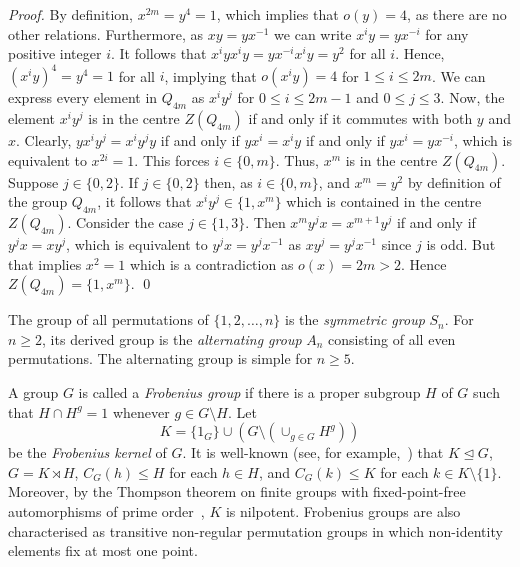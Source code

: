 \documentclass{elsarticle}
\begin{document}
\begin{proof}
  By definition, $x^{2m}=y^4=1$, which implies that $o(y)=4$, as there
  are no other relations. Furthermore, as $xy=yx^{-1}$ we can write
  $x^iy=yx^{-i}$ for any positive integer $i$. It follows that
  $x^iyx^iy=yx^{-i}x^iy=y^2$ for all $i$. Hence, $(x^iy)^4=y^4=1$ for
  all $i$, implying that $o(x^iy)=4$ for $1\le i\le 2m$. We can
  express every element in $Q_{4m}$ as $x^iy^j$ for $0\le i\le 2m-1$
  and $0\le j\le 3$. Now, the element $x^iy^j$ is in the centre
  $Z(Q_{4m})$ if and only if it commutes with both $y$ and $x$.
  Clearly, $yx^iy^j=x^iy^jy$ if and only if $yx^i=x^iy$ if and only if
  $yx^i=yx^{-i}$, which is equivalent to $x^{2i}=1$. This forces
  $i\in\{0,m\}$. Thus, $x^m$ is in the centre $Z(Q_{4m})$. Suppose
  $j\in\{0,2\}$. If $j\in\{0,2\}$ then, as $i\in\{0,m\}$, and
  $x^m=y^2$ by definition of the group $Q_{4m}$, it follows that
  $x^iy^j\in \{1,x^m\}$ which is contained in the centre
  $Z(Q_{4m})$. Consider the case $j\in\{1,3\}$. Then
  $x^my^jx=x^{m+1}y^j$ if and only if $y^jx=xy^j$, which is equivalent
  to $y^jx=y^jx^{-1}$ as $xy^j=y^jx^{-1}$ since $j$ is odd.  But that
  implies $x^2=1$ which is a contradiction as $o(x)=2m>2$. Hence
  $Z(Q_{4m})=\{1,x^m\}$. \qed
\end{proof}


The group of all permutations of $\{1,2,\ldots,n\}$ is the \emph{symmetric
group} $S_n$. For $n\ge2$, its derived group is the \emph{alternating group}
$A_n$ consisting of all even permutations. The alternating group is simple
for $n\ge5$.

A group $G$ is called a {\em Frobenius group} if there is a proper
subgroup $H$ of $G$ such that $H \cap H^g=1$ whenever
$g \in G\setminus H$. Let
$$ K=\{1_G\} \cup (G \setminus ( \cup_{g \in G} H^g))$$ be the {\em
  Frobenius kernel} of $G$. It is well-known (see, for
example,~\cite[35.24 and~35.25]{Asch86}) that $K \trianglelefteq G$,
$G=K \rtimes H$, $C_G(h)\le H$ for each $h \in H$, and $C_G(k)\le K$
for each $k \in K\setminus \{1\}$.  Moreover, by the Thompson theorem on finite
groups with fixed-point-free automorphisms of prime
order~\cite[Theorem~1]{Thompson}, $K$ is nilpotent.  Frobenius groups
are also characterised as transitive non-regular permutation groups in
which non-identity elements fix at most one point.

\medskip
\end{document}
